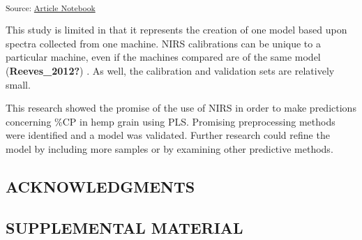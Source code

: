 \documentclass[
]{agujournal2019}
\begin{document}
\textsubscript{Source:
\href{https://rvcrawford.github.io/glowing-system/index-preview.html}{Article
Notebook}}

This study is limited in that it represents the creation of one model
based upon spectra collected from one machine. NIRS calibrations can be
unique to a particular machine, even if the machines compared are of the
same model (\textbf{Reeves\_2012?}) . As well, the calibration and
validation sets are relatively small.

This research showed the promise of the use of NIRS in order to make
predictions concerning \%CP in hemp grain using PLS. Promising
preprocessing methods were identified and a model was validated. Further
research could refine the model by including more samples or by
examining other predictive methods.

\subsection{ACKNOWLEDGMENTS}\label{acknowledgments}

\subsection{SUPPLEMENTAL MATERIAL}\label{supplemental-material}
\end{document}
